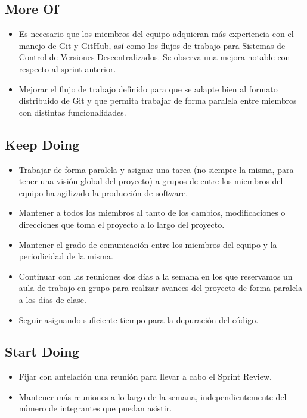 \documentclass{article}
\begin{document}
\subsection{More Of}
\begin{itemize}
\item Es necesario que los miembros del equipo adquieran más experiencia con el manejo de Git y GitHub, así como los flujos de trabajo para Sistemas de Control de Versiones Descentralizados. Se observa una mejora notable con respecto al sprint anterior.

\item Mejorar el flujo de trabajo definido para que se adapte bien al formato distribuido de Git y que permita trabajar de forma paralela entre miembros con distintas funcionalidades.

\end{itemize}
\subsection{Keep Doing}
\begin{itemize}
\item Trabajar de forma paralela y asignar una tarea (no siempre la misma, para tener una visión global del proyecto) a grupos de entre los miembros del equipo ha agilizado la producción de software.

\item Mantener a todos los miembros al tanto de los cambios, modificaciones o direcciones que toma el proyecto a lo largo del proyecto.

\item Mantener el grado de comunicación entre los miembros del equipo y la periodicidad de la misma.

\item Continuar con las reuniones dos días a la semana en los que reservamos un aula de trabajo en grupo para realizar avances del proyecto de forma paralela a los días de clase.

\item Seguir asignando suficiente tiempo para la depuración del código.

\end{itemize}



\subsection{Start Doing}
\begin{itemize}
\item Fijar con antelación una reunión para llevar a cabo el Sprint Review.

\item Mantener más reuniones a lo largo de la semana, independientemente del número de integrantes que puedan asistir.

\end{itemize}
\end{document}

